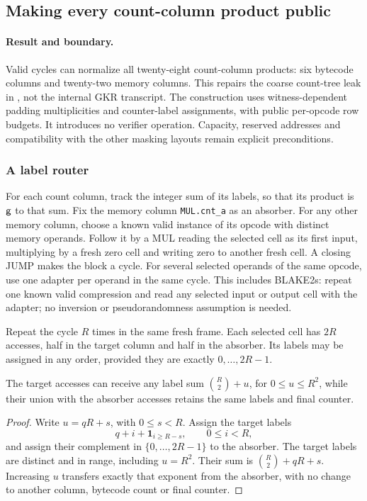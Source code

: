 \subsection{Making every count-column product public}\label{note:zk-count-columns}

\paragraph{Result and boundary.} Valid cycles can normalize all twenty-eight count-column products: six bytecode columns and twenty-two memory columns. This repairs the coarse count-tree leak in , not the internal GKR transcript. The construction uses witness-dependent padding multiplicities and counter-label assignments, with public per-opcode row budgets. It introduces no verifier operation. Capacity, reserved addresses and compatibility with the other masking layouts remain explicit preconditions.

\subsubsection{A label router}

For each count column, track the integer sum of its labels, so that its product is $\mathsf{g}$ to that sum. Fix the memory column \texttt{MUL.cnt\_a} as an absorber. For any other memory column, choose a known valid instance of its opcode with distinct memory operands. Follow it by a MUL reading the selected cell as its first input, multiplying by a fresh zero cell and writing zero to another fresh cell. A closing JUMP makes the block a cycle. For several selected operands of the same opcode, use one adapter per operand in the same cycle. This includes BLAKE2s: repeat one known valid compression and read any selected input or output cell with the adapter; no inversion or pseudorandomness assumption is needed.

Repeat the cycle $R$ times in the same fresh frame. Each selected cell has $2R$ accesses, half in the target column and half in the absorber. Its labels may be assigned in any order, provided they are exactly $0,\ldots,2R-1$.

\begin{lemma}\label{lem:zk-square-label-transfer}
The target accesses can receive any label sum $\binom R2+u$, for $0\le u\le R^2$, while their union with the absorber accesses retains the same labels and final counter.
\end{lemma}
\begin{proof}
Write $u=qR+s$, with $0\le s<R$. Assign the target labels
\[
 q+i+\mathbf 1_{i\ge R-s},\qquad 0\le i<R,
\]
and assign their complement in $\{0,\ldots,2R-1\}$ to the absorber. The target labels are distinct and in range, including $u=R^2$. Their sum is $\binom R2+qR+s$. Increasing $u$ transfers exactly that exponent from the absorber, with no change to another column, bytecode count or final counter.
\end{proof}

